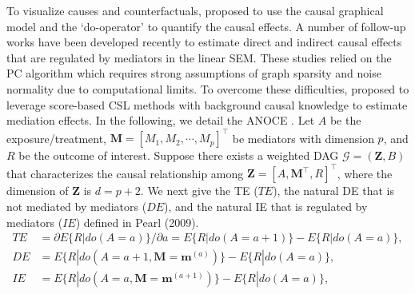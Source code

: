 





 


 
To visualize causes and counterfactuals, \citet{pearl2009causal} proposed to use the causal graphical model and the `do-operator' to quantify the causal effects. A number of follow-up works \citep[e.g.,][]{maathuis2009estimating,nandy2017estimating,chakrabortty2018inference} have been developed recently to estimate direct and indirect causal effects that are regulated by mediators in the linear SEM. These studies relied on the PC algorithm \citep{spirtes2000constructing} which requires strong assumptions of graph sparsity and noise normality due to computational limits. To overcome these difficulties,  \citet{cai2020anoce} proposed to leverage score-based \acrshort{CSL} methods \citep[e.g.,][]{ramsey2017million,zheng2018dags,yu2019dag,zhu2019causal} with background causal knowledge to estimate mediation effects. %
 In the following, we detail the \acrfull{ANOCE} \citep{cai2020anoce}.   
Let $A$ be the exposure/treatment, $\mathbf{M}=[M_1,M_2,\cdots,M_p]^\top $ be mediators with dimension $p$, and $R$ be the outcome of interest. Suppose there exists a weighted \acrshort{DAG} $\mathcal{G}=(\mathbf{Z},B)$ that characterizes the causal relationship among $\mathbf{Z}=[A, \mathbf{M}^\top, R]^\top $, where the dimension of $\mathbf{Z}$ is $d=p+2$.  We next give the \acrlong{TE} ($TE$), the natural \acrlong{DE} that is not mediated by mediators ($DE$), and the natural \acrlong{IE} that is regulated by mediators ($IE$) defined in Pearl (2009).
\begin{equation*}
\begin{split}
TE &={\partial E\{R|do(A=a)\} / \partial a}= E\{R|do(A=a+1)\}-E\{R|do(A=a)\},\\
DE &= E\{R|do(A=a+1, \mathbf{M}=\mathbf{m}^{(a)})\}-E\{R|do(A=a)\},\\
IE &= E\{R|do(A=a, \mathbf{M}=\mathbf{m}^{(a+1)})\}-E\{R|do(A=a)\},
\end{split}
\end{equation*}
